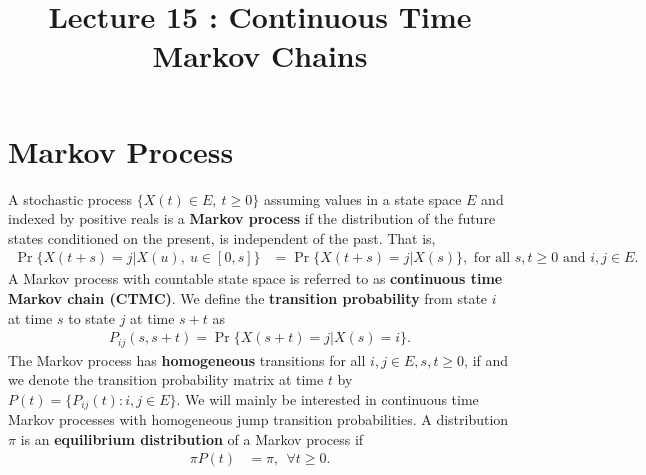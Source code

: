 \documentclass[a4paper,10pt,english]{article}
\title{Lecture 15 : Continuous Time Markov Chains}
\author{}
\begin{document}
\maketitle

\section{Markov Process}
A stochastic process $\{X(t) \in E, ~ t \geqslant 0\}$ assuming values in a state space $E$ and 
indexed by positive reals is a \textbf{Markov process} if 
the distribution of the future states conditioned on the present, is independent of the past. 
That is,
\begin{align*}
\Pr\{X(t+s) = j |X(u),~ u \in [0,s]\} &= \Pr\{X(t+s) = j |X(s)\}, \text{ for all } s, t \geqslant 0 \text{ and } i, j \in E.
\end{align*} 
A Markov process with countable state space is referred to as \textbf{continuous time Markov chain (CTMC)}. 
We define the \textbf{transition probability} from state $i$ at time $s$ to state $j$ at time $s+t$ as 
\begin{align*}
P_{ij}(s, s+t) = \Pr\{X(s+t) = j | X(s) = i\}.
\end{align*}
The Markov process has \textbf{homogeneous} transitions for all $i,j \in E, s,t \geqslant 0$, if
and we denote the transition probability matrix at time $t$ by $P(t) = \{P_{ij}(t): i, j \in E\}$. 
We will mainly be interested in continuous time Markov processes with homogeneous jump transition probabilities. 
A distribution $\pi$ is an \textbf{equilibrium distribution} of a Markov process if
\begin{align*}
\pi P(t) &= \pi,~~ \forall t \geqslant 0. 
\end{align*}
\end{document}
